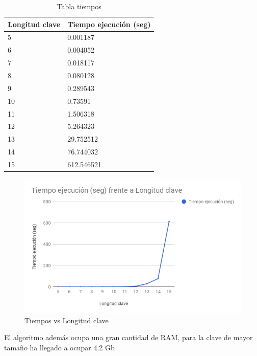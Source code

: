 \begin{table}[htbp]
	\begin{center}
		\begin{tabular}{|l|l|}
			\hline
			\rowcolor{LightCyan}
			Longitud clave & Tiempo ejecución (seg) \\ \hline
			5 & 0.001187 \\ \hline 
			6 & 0.004052 \\ \hline
			7 & 0.018117 \\ \hline
			8 & 0.080128\\ \hline
			9 & 0.289543\\ \hline
			10 & 0.73591\\ \hline
			11 & 1.506318\\ \hline
			12 & 5.264323\\ \hline
			13 & 29.752512\\ \hline
			14 & 76.744032 \\ \hline
			15 & 612.546521\\ \hline
		\end{tabular}
		\caption{Tabla tiempos}
		\label{tabla:resumen}
	\end{center}
\end{table}


\begin{figure}[H]
	\includegraphics[width=1\linewidth]{chart}
	\caption{Tiempos vs Longitud clave}
\end{figure}

El algoritmo además ocupa una gran cantidad  de RAM, para la clave de mayor tamaño ha llegado a ocupar 4.2 Gb



